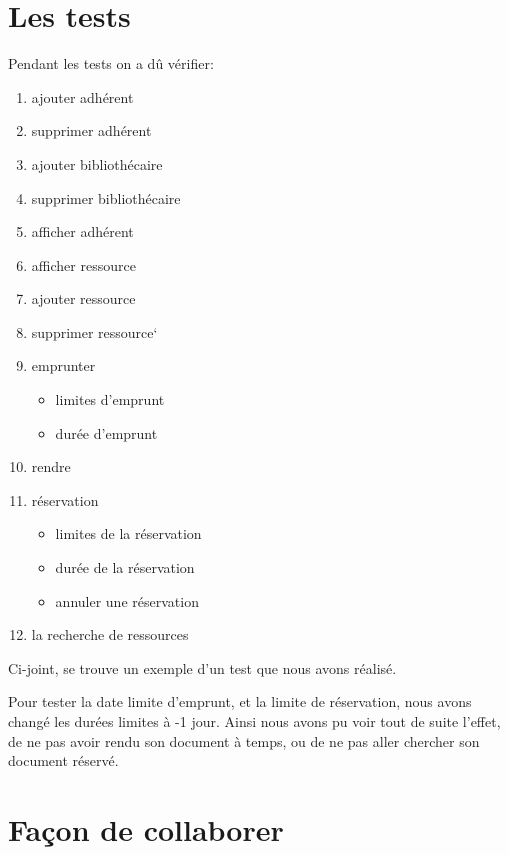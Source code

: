 \documentclass[10pt, a4paper]{article}
\begin{document}
	\section{Les tests}
	Pendant les tests on a dû vérifier:
	\begin{enumerate}
		\item ajouter adhérent
		\item supprimer adhérent
		\item ajouter bibliothécaire
		\item supprimer bibliothécaire
		\item afficher adhérent
		\item afficher ressource
		\item ajouter ressource
		\item supprimer ressource`
		\item emprunter
		\begin{itemize}
			\item limites d'emprunt
			\item durée d'emprunt
		\end{itemize}
		\item rendre
		\item réservation
		\begin{itemize}
			\item limites de la réservation
			\item durée de  la réservation
			\item annuler une réservation
		\end{itemize}
		\item la recherche de ressources 
	\end{enumerate}
	
		\bigbreak
	
	Ci-joint, se trouve un exemple d'un test que nous avons réalisé.
	
	Pour tester la date limite d'emprunt, et la limite de réservation, nous avons changé les durées limites à -1 jour. Ainsi nous 
	avons pu voir tout de suite l'effet, de ne pas avoir rendu son document à temps, ou de ne pas aller chercher son document 
	réservé.
	
	\section{Façon de collaborer}
\end{document}
